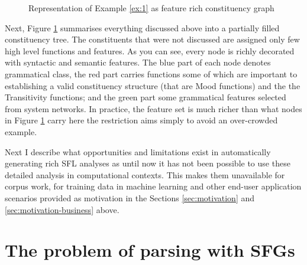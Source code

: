 \begin{figure}[!ht]
    \caption{Representation of Example \ref{ex:1} as feature rich constituency graph}
    \label{fig:mcg-graph-example}
\end{figure}


Next, Figure \ref{fig:mcg-graph-example} summarises everything discussed above into a partially filled constituency tree. The constituents that were not discussed are assigned only few high level functions and features. As you can see, every node is richly decorated with syntactic and semantic features. The blue part of each node denotes grammatical class, the red part carries functions some of  which are important to establishing a valid constituency structure (that are Mood functions) and the the Transitivity functions; and the green part some grammatical features selected from system networks. In practice, the feature set is much richer than what nodes in Figure \ref{fig:mcg-graph-example} carry here the restriction aims simply to avoid an over-crowded example. 



Next I describe what opportunities and limitations exist in automatically generating rich SFL analyses as until now it has not been possible to use these detailed analysis in computational contexts. This makes them unavailable for corpus work, for training data in machine learning and other end-user application scenarios provided as motivation in the Sections \ref{sec:motivation} and \ref{sec:motivation-business} above.

\section{The problem of parsing with SFGs}
\label{sec:problem}


